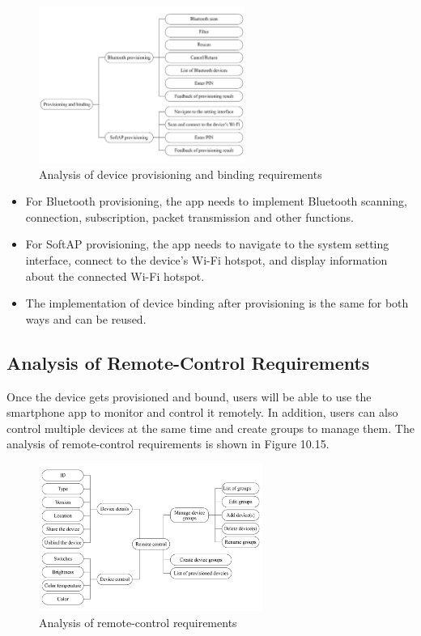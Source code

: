 \documentclass[a4paper,12pt,openany]{book}
\begin{document}
\begin{figure}[ht]
    \centering
    \includegraphics[width=0.6\textwidth]{D10Z/10-14}
    \caption{Analysis of device provisioning and binding requirements}
\end{figure}

\begin{itemize}
    \item For Bluetooth provisioning, the app needs to implement Bluetooth scanning, connection, subscription, packet transmission and other functions.
    \item For SoftAP provisioning, the app needs to navigate to the system setting interface, connect to the device’s Wi-Fi hotspot, and display information about the connected Wi-Fi hotspot.
    \item The implementation of device binding after provisioning is the same for both ways and can be reused.
\end{itemize}

\subsection{Analysis of Remote-Control Requirements}
Once the device gets provisioned and bound, users will be able to use the smartphone app to monitor and control it remotely. In addition, users can also control multiple devices at the same time and create groups to manage them. The analysis of remote-control requirements is shown in Figure 10.15.

\begin{figure}[ht]
    \centering
    \includegraphics[width=0.65\textwidth]{D10Z/10-15}
    \caption{Analysis of remote-control requirements}
\end{figure}
\end{document}
